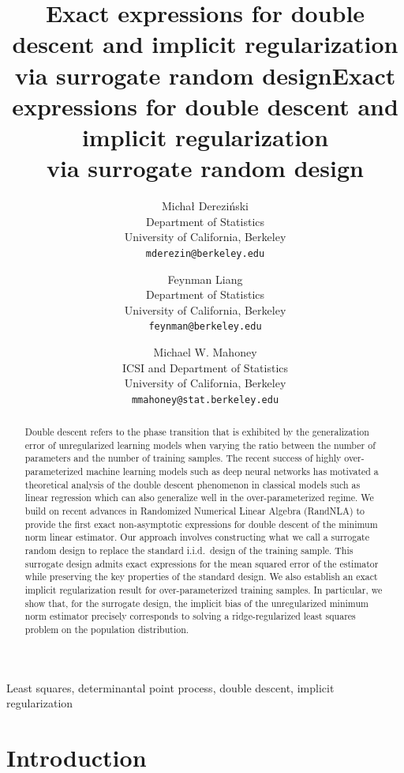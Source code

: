 \documentclass[11pt]{article}
\title{Exact expressions for double descent
and implicit regularization
\\
via surrogate random design}
\author{%
          Micha{\l } Derezi\'{n}ski \\
  Department of Statistics\\
  University of California, Berkeley\\
  \texttt{mderezin@berkeley.edu}\\
  \and
  Feynman Liang \\
  Department of Statistics\\
  University of California, Berkeley\\
  \texttt{feynman@berkeley.edu}
  \and
   Michael W. Mahoney\\
  ICSI and Department of Statistics\\
  University of California, Berkeley\\
  \texttt{mmahoney@stat.berkeley.edu}
}
\title[Exact expressions for double descent and implicit
regularization]{Exact expressions for double descent and implicit
  regularization\\
  via surrogate random design}
\begin{document}
\maketitle

\begin{abstract}
  Double descent refers to the phase transition that is exhibited by
  the generalization error of unregularized learning models when varying the ratio
  between the number of parameters and the number of training
  samples. The recent success of highly over-parameterized machine learning
  models such as deep neural networks has motivated a theoretical analysis of
  the double descent phenomenon in classical models such as linear
  regression which can also generalize well in the over-parameterized
  regime. We build on recent advances in Randomized Numerical Linear
  Algebra (RandNLA) to provide the first exact non-asymptotic
  expressions for double descent of the minimum norm linear
  estimator. Our approach involves constructing
  what we call a surrogate random design to replace the standard
  i.i.d.~design of the training sample. This surrogate design admits
  exact expressions for the mean squared error of the estimator while
  preserving the key properties of the standard design.
  We also establish an exact implicit regularization result for
  over-parameterized training samples. In particular, we show that, for
  the surrogate design, the implicit bias of the unregularized minimum
  norm estimator precisely corresponds to solving a ridge-regularized
  least squares problem on the population distribution.
\end{abstract}

\ifisarxiv\else
\begin{keywords}
  Least squares, determinantal point process,
  double descent, implicit regularization
\end{keywords}
\fi

\section{Introduction}
\end{document}
